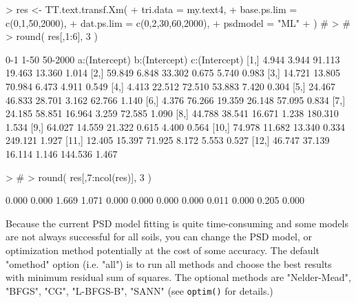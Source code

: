\documentclass[a4paper]{article}
\begin{document}
\begin{Schunk}
\begin{Sinput}
> res <- TT.text.transf.Xm(
+     tri.data    = my.text4,
+     base.ps.lim = c(0,1,50,2000),
+     dat.ps.lim  = c(0,2,30,60,2000),
+     psdmodel    = "ML"
+ )   #
> #
> round( res[,1:6], 3 ) 
\end{Sinput}
\begin{Soutput}
         0-1   1-50 50-2000 a:(Intercept) b:(Intercept) c:(Intercept)
 [1,]  4.944  3.944  91.113        19.463        13.360         1.014
 [2,] 59.849  6.848  33.302         0.675         5.740         0.983
 [3,] 14.721 13.805  70.984         6.473         4.911         0.549
 [4,]  4.413 22.512  72.510        53.883         7.420         0.304
 [5,] 24.467 46.833  28.701         3.162        62.766         1.140
 [6,]  4.376 76.266  19.359        26.148        57.095         0.834
 [7,] 24.185 58.851  16.964         3.259        72.585         1.090
 [8,] 44.788 38.541  16.671         1.238       180.310         1.534
 [9,] 64.027 14.559  21.322         0.615         4.400         0.564
[10,] 74.978 11.682  13.340         0.334       249.121         1.927
[11,] 12.405 15.397  71.925         8.172         5.553         0.527
[12,] 46.747 37.139  16.114         1.146       144.536         1.467
\end{Soutput}
\begin{Sinput}
> #
> round( res[,7:ncol(res)], 3 ) 
\end{Sinput}
\begin{Soutput}
 [1] 0.000 0.000 1.669 1.071 0.000 0.000 0.000 0.000 0.011 0.000 0.205 0.000
\end{Soutput}
\end{Schunk}

Because the current PSD model fitting is quite time-consuming and
some models are not always successful for all soils, you can change
the PSD model, or optimization method potentially at the cost of some accuracy.
The default "omethod" option (i.e. "all") is to run all methods and
choose the best results with minimum residual sum of squares. The
optional methods are "Nelder-Mead", "BFGS", "CG", "L-BFGS-B", "SANN"
(see \texttt{optim()} for details.)
\end{document}
